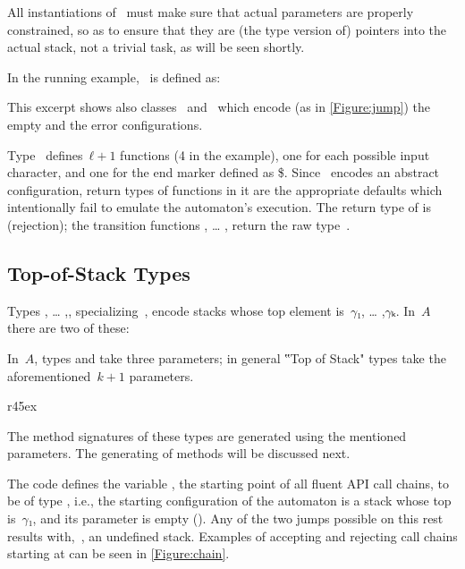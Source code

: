 All instantiations of~ must make sure that actual parameters are properly constrained,
  so as to ensure that they are (the type version of) pointers into the actual stack,
  not a trivial task, as will be seen shortly.

In the running example,~ is defined as:
\begin{quote}
\end{quote}
This excerpt shows also classes~ and~ which encode (as in \cref{Figure:jump})
  the empty and the error configurations.

Type~ defines~$ℓ+1$ functions (4 in the example), one for each possible input character,
  and one for the end marker defined as \$.
Since~ encodes an abstract configuration, return types of functions in it
  are the appropriate defaults which intentionally fail to emulate the automaton's execution.
  The return type of \cc{\$()} is  (rejection);
  the transition functions , … , return the raw type~.

\subsection{Top-of-Stack Types}

Types , … ,, specializing~,
  encode stacks whose top element is~$γ₁$, … ,$γₖ$.
In~$A$ there are two of these:
\begin{quote}
\end{quote}

In~$A$, types  and  take three parameters;
in general ‟Top of Stack" types take the aforementioned~$k+1$ parameters.

\begin{wrapfigure}[14]r{45ex}
  \caption{\label{Figure:chain} Accepting and non-accepting call chains with the
  type encoding of jDPDA~$A$ (as defined in \cref{Table:A})}
\end{wrapfigure}

The method signatures of these types are generated using the mentioned parameters.
The generating of methods will be discussed next.

The code defines the  variable , the starting point
of all fluent API call chains, to be of type , i.e.,
  the starting configuration of the automaton is a stack whose top is~$γ₁$,
  and its  parameter is empty ().
Any of the two jumps possible on this rest results with,~,
  an undefined stack.
Examples of accepting and rejecting call chains starting at 
  can be seen in \cref{Figure:chain}.

